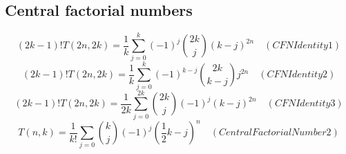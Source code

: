 \subsection{Central factorial numbers}\label{subsec:central-factorial-numbers}

\begin{equation*}
(2k-1)!T(2n,2k) = \frac{1}{k} \sum_{j=0}^{k} (-1)^j \binom{2k}{j} (k-j)^{2n} \quad
(CFNIdentity1)
\end{equation*}
\begin{equation*}
(2k-1)!T(2n,2k) = \frac{1}{k} \sum_{j=0}^{k} (-1)^{k-j} \binom{2k}{k-j} j^{2n} \quad
(CFNIdentity2)
\end{equation*}
\begin{equation*}
(2k-1)!T(2n, 2k) = \frac{1}{2k} \sum_{j=0}^{2k} \binom{2k}{j} (-1)^{j} (k-j)^{2n} \quad
(CFNIdentity3)
\end{equation*}
\begin{equation*}
    T(n,k) = \frac{1}{k!} \sum_{j=0} \binom{k}{j} (-1)^{j} \left( \frac{1}{2}k - j \right)^{n} \quad
    (CentralFactorialNumber2)
\end{equation*}

